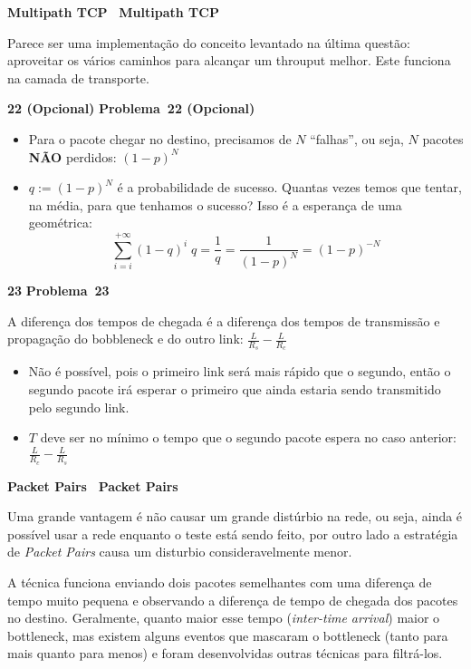 \documentclass{article}
\newcounter{exe-list}
\newenvironment{exe-list}
    {\begin{list}{\alph{exe-list}.}{\usecounter{exe-list}}}
    {\end{list}}
\newenvironment{exe}[2][Problema]
    {\newcommand{\opt}{(Opcional)}%
    \newcommand{\sketch}[1]{{\bfseries Rascunho:} ##1}%
    \medskip\par\noindent\ifthenelse{\equal{#1}{}}
        {\textbf{\large #2}}
        {\textbf{\large #1~#2}}%
    \medskip\par\noindent}
    {\medskip}
\begin{document}
\begin{exe}[]{Multipath TCP}
    Parece ser uma implementação do conceito levantado
    na última questão:
    aproveitar os vários caminhos
    para alcançar um throuput melhor.
    Este funciona na camada de transporte.
\end{exe}

\begin{exe}{22 \opt}
    \begin{itemize}
        \item Para o pacote chegar no destino,
            precisamos de \(N\) ``falhas'',
            ou seja, \(N\) pacotes \textbf{NÃO} perdidos:
            \( (1-p)^N \)
        \item \( q := (1-p)^N \) é a probabilidade de sucesso.
            Quantas vezes temos que tentar, na média,
            para que tenhamos o sucesso?
            Isso é a esperança de uma geométrica:
            \[
                \sum_{i = i}^{+\infty} (1-q)^i \; q
                = \frac{1}{q}
                = \frac{1}{(1-p)^N}
                = (1-p)^{-N}
            \]
    \end{itemize}
\end{exe}

\begin{exe}{23}
    \begin{exe-list}
    \item A diferença dos tempos de chegada é
        a diferença dos tempos de transmissão e propagação
        do bobbleneck e do outro link:
        \( \frac{L}{R_s} - \frac{L}{R_c} \)
    \item \begin{itemize}
            \item Não é possível,
                pois o primeiro link será mais rápido que o segundo,
                então o segundo pacote irá esperar o primeiro
                que ainda estaria sendo transmitido pelo segundo link.
            \item \(T\) deve ser no mínimo o tempo que
                o segundo pacote espera no caso anterior:
                \( \frac{L}{R_c} - \frac{L}{R_s} \)
        \end{itemize}
    \end{exe-list}
\end{exe}

\begin{exe}[]{Packet Pairs}
    Uma grande vantagem é não causar
    um grande distúrbio na rede,
    ou seja, ainda é possível usar a rede
    enquanto o teste está sendo feito,
    por outro lado a estratégia de \emph{Packet Pairs}
    causa um disturbio consideravelmente menor.

    A técnica funciona enviando dois pacotes semelhantes
    com uma diferença de tempo muito pequena e
    observando a diferença de tempo de chegada dos pacotes no destino.
    Geralmente, quanto maior esse tempo (\emph{inter-time arrival})
    maior o bottleneck,
    mas existem alguns eventos que mascaram o bottleneck
    (tanto para mais quanto para menos) e
    foram desenvolvidas outras técnicas para filtrá-los.
\end{exe}
\end{document}
